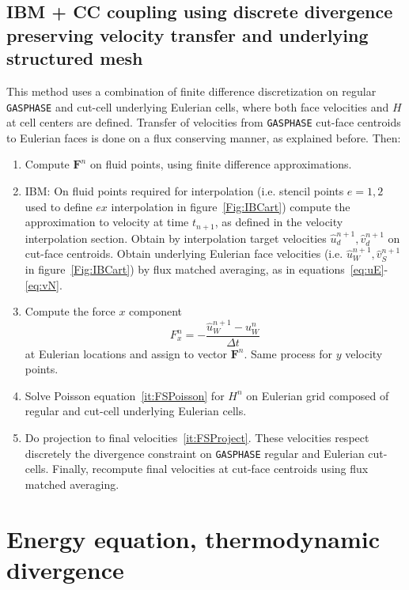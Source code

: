 \subsection{IBM + CC coupling using discrete divergence preserving velocity transfer and underlying structured mesh}

This method uses a combination of finite difference discretization on regular \texttt{GASPHASE} and cut-cell underlying Eulerian cells, where both face velocities and $H$ at cell centers are defined. Transfer of velocities from \texttt{GASPHASE} cut-face centroids to Eulerian faces is done on a flux conserving manner, as explained before. Then:
%
\begin{enumerate}

  \item Compute $\mathbf{F}^{n}$ on fluid points, using finite difference approximations.

  \item IBM: On fluid points required for interpolation (i.e. stencil points $e=1,2$ used to define $ex$ interpolation in figure~\ref{Fig:IBCart}) compute the approximation to velocity at time $t_{n+1}$, as defined in the velocity interpolation section. Obtain by interpolation target velocities $\hat{u}_d^{n+1},\hat{v}_d^{n+1}$ on cut-face centroids. Obtain underlying Eulerian face velocities (i.e. $\hat{u}_W^{n+1},\hat{v}_S^{n+1}$ in figure~\ref{Fig:IBCart}) by flux matched averaging, as in equations~\eqref{eq:uE}-\eqref{eq:vN}.

  \item Compute the force $x$ component
  \begin{equation}
    F_x^n = -\frac{\hat{u}_{W}^{n+1}-u_W^n}{\Delta t}  %
  \end{equation}
   at Eulerian locations and assign to vector $\mathbf{F}^{n}$. Same process for $y$ velocity  points.

  \item Solve Poisson equation~\eqref{it:FSPoisson} for $H^{n}$ on Eulerian grid composed of regular and cut-cell underlying Eulerian cells.
  \item Do projection to final velocities~\eqref{it:FSProject}. These velocities respect discretely the divergence constraint on \texttt{GASPHASE} regular and Eulerian cut-cells. Finally, recompute final velocities at cut-face centroids using flux matched averaging.
\end{enumerate}
%


\section{Energy equation, thermodynamic divergence}

